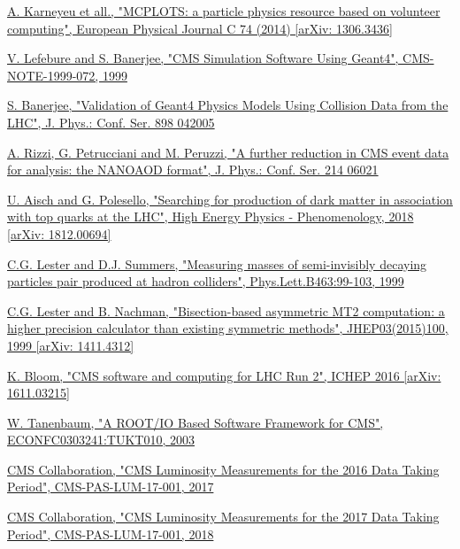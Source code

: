 \documentclass[a4paper, 10pt, openright]{report}
\begin{document}
\begin{thebibliography}{1}
\href{https://arxiv.org/abs/1306.3436}{A. Karneyeu et all.,
"MCPLOTS: a particle physics resource based on volunteer computing",
European Physical Journal C 74 (2014) [arXiv: 1306.3436]}

\href{http://inspirehep.net/record/876352}{V. Lefebure and S. Banerjee,
"CMS Simulation Software Using Geant4",
CMS-NOTE-1999-072, 1999}

\href{https://iopscience.iop.org/article/10.1088/1742-6596/898/4/042005/pdf}{S. Banerjee,
"Validation of Geant4 Physics Models Using Collision Data from the LHC",
J. Phys.: Conf. Ser. 898 042005}

\href{https://www.researchgate.net/publication/335864848_A_further_reduction_in_CMS_event_data_for_analysis_the_NANOAOD_format}{A. Rizzi, G. Petrucciani and M. Peruzzi,
"A further reduction in CMS event data for analysis: the NANOAOD format",
J. Phys.: Conf. Ser. 214 06021}

\href{https://arxiv.org/abs/1812.00694}{U. Aisch and G. Polesello,
"Searching for production of dark matter in association with top quarks at the LHC",
High Energy Physics - Phenomenology, 2018 [arXiv: 1812.00694]}

\href{https://arxiv.org/abs/hep-ph/9906349}{C.G. Lester and D.J. Summers,
"Measuring masses of semi-invisibly decaying particles pair produced at hadron colliders",
Phys.Lett.B463:99-103, 1999}

\href{https://arxiv.org/abs/1411.4312}{C.G. Lester and B. Nachman,
"Bisection-based asymmetric MT2 computation: a higher precision calculator than existing symmetric methods",
JHEP03(2015)100, 1999 [arXiv: 1411.4312]}

\href{https://arxiv.org/abs/1611.03215}{K. Bloom,
"CMS software and computing for LHC Run 2",
ICHEP 2016 [arXiv: 1611.03215]}

\href{https://arxiv.org/abs/cs/0306034}{W. Tanenbaum,
"A ROOT/IO Based Software Framework for CMS",
ECONFC0303241:TUKT010, 2003}

\href{https://cds.cern.ch/record/2257069}{CMS Collaboration,
"CMS Luminosity Measurements for the 2016 Data Taking Period",
CMS-PAS-LUM-17-001, 2017}

\href{http://inspirehep.net/record/1677076}{CMS Collaboration,
"CMS Luminosity Measurements for the 2017 Data Taking Period",
CMS-PAS-LUM-17-001, 2018}


\end{thebibliography}
\end{document}
